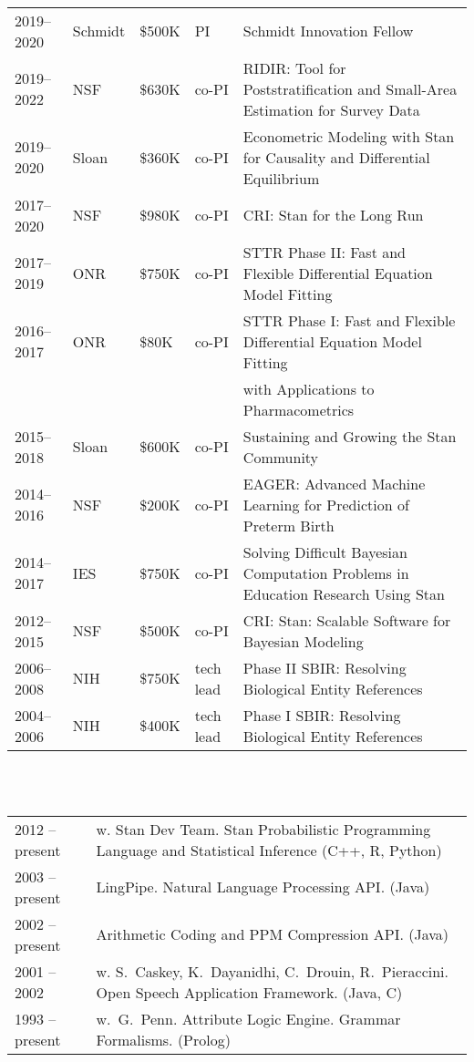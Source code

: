 \documentclass[10pt]{paper}
\newcommand{\heading}[1]{\noindent{\Large\bf\sffamily #1}\\[6pt]}
\newcommand{\publ}[2]{#1 & \begin{minipage}[t]{0.9\textwidth}#2\end{minipage}\\[4pt]}
\begin{document}
\heading{Grant Funding}
%
\begin{tabular}{lllll}
2019--2020 & Schmidt & \$500K & PI & Schmidt Innovation Fellow
\\[3pt]
2019--2022 & NSF & \$630K & co-PI & RIDIR: Tool for Poststratification and
                            Small-Area Estimation for Survey Data
\\[3pt]
2019--2020 & Sloan & \$360K & co-PI & Econometric Modeling with Stan for
                                      Causality and Differential Equilibrium
\\[3pt]
2017--2020 & NSF & \$980K & co-PI & CRI: Stan for the Long Run
\\[3pt]
2017--2019 & ONR & \$750K & co-PI & STTR Phase II: Fast and Flexible
                                 Differential Equation Model Fitting
\\[3pt]
2016--2017 & ONR & \$80K & co-PI & STTR Phase I: Fast and Flexible
                                   Differential Equation Model Fitting
\\[1pt]
& & & &                                    with Applications to Pharmacometrics
\\[3pt]
2015--2018 & Sloan & \$600K & co-PI & Sustaining and Growing the Stan Community
\\[3pt]
2014--2016 & NSF & \$200K & co-PI & EAGER: Advanced Machine Learning
for Prediction of Preterm Birth
\\[3pt]
2014--2017 & IES & \$750K & co-PI & Solving Difficult Bayesian Computation Problems in Education Research Using Stan
\\[3pt]
2012--2015 & NSF & \$500K & co-PI & CRI: Stan: Scalable Software for
Bayesian Modeling
\\[3pt]
2006--2008 & NIH & \$750K & tech lead & Phase II SBIR: Resolving Biological Entity References
\\[3pt]
2004--2006 & NIH & \$400K & tech lead & Phase I SBIR: Resolving Biological Entity References
\end{tabular}
\\[10pt]

\heading{Open Source Software}
%
\begin{tabular}{ll}
\publ{2012 -- present}{w. Stan Dev Team.  Stan Probabilistic Programming Language and
  Statistical Inference (C++, R, Python)\vspace*{6pt}}
\publ{2003 -- present}{LingPipe. Natural Language Processing API. (Java)}
\publ{2002 -- present}{Arithmetic Coding and PPM Compression API. (Java)}
\publ{2001 -- 2002}{w. S.~Caskey, K.~Dayanidhi, C.~Drouin, R.~Pieraccini. Open Speech Application Framework. (Java, C)}
\publ{1993 -- present}{w.\ G.~Penn. Attribute Logic Engine. Grammar Formalisms. (Prolog)}
\end{tabular}
\\[8pt]
\end{document}
